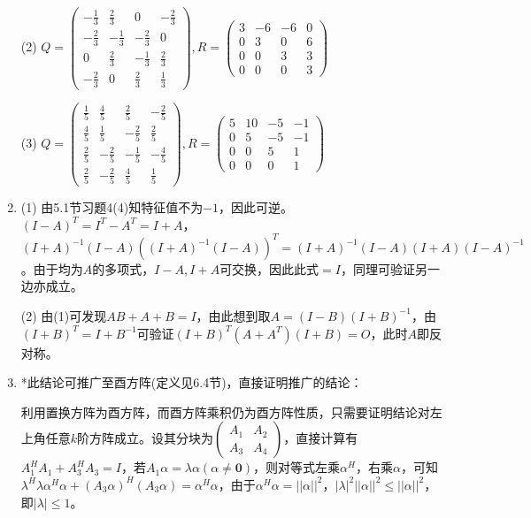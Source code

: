 \documentclass[a4paper,UTF8,fontset=windows]{ctexart}
\begin{document}
\begin{enumerate}
(2) $Q=\begin{pmatrix}-\frac{1}{3}&\frac{2}{3}&0&-\frac{2}{3}\\[1.5ex]-\frac{2}{3}&-\frac{1}{3}&-\frac{2}{3}&0\\[1.5ex]0&\frac{2}{3}&-\frac{1}{3}&\frac{2}{3}\\[1.5ex]-\frac{2}{3}&0&\frac{2}{3}&\frac{1}{3}\end{pmatrix},R=\begin{pmatrix}3&-6&-6&0\\0&3&0&6\\0&0&3&3\\0&0&0&3\end{pmatrix}$

(3) $Q=\begin{pmatrix}\frac{1}{5}&\frac{4}{5}&\frac{2}{5}&-\frac{2}{5}\\[1.5ex]\frac{4}{5}&\frac{1}{5}&-\frac{2}{5}&\frac{2}{5}\\[1.5ex]\frac{2}{5}&-\frac{2}{5}&-\frac{1}{5}&-\frac{4}{5}\\[1.5ex]\frac{2}{5}&-\frac{2}{5}&\frac{4}{5}&\frac{1}{5}\end{pmatrix},R=\begin{pmatrix}5&10&-5&-1\\0&5&-5&-1\\0&0&5&1\\0&0&0&1\end{pmatrix}$

\item
(1) 由5.1节习题4(4)知特征值不为$-1$，因此可逆。$(I-A)^T=I^T-A^T=I+A$，$(I+A)^{-1}(I-A)((I+A)^{-1}(I-A))^T=(I+A)^{-1}(I-A)(I+A)(I-A)^{-1}$。由于均为$A$的多项式，$I-A,I+A$可交换，因此此式$=I$，同理可验证另一边亦成立。

(2) 由(1)可发现$AB+A+B=I$，由此想到取$A=(I-B)(I+B)^{-1}$，由$(I+B)^T=I+B^{-1}$可验证$(I+B)^T(A+A^T)(I+B)=O$，此时$A$即反对称。

\item
*此结论可推广至酉方阵(定义见6.4节)，直接证明推广的结论：

利用置换方阵为酉方阵，而酉方阵乘积仍为酉方阵性质，只需要证明结论对左上角任意$k$阶方阵成立。设其分块为$\begin{pmatrix}A_1&A_2\\A_3&A_4\end{pmatrix}$，直接计算有$A_1^HA_1+A_3^HA_3=I$，若$A_1\alpha=\lambda\alpha(\alpha\ne\mathbf{0})$，则对等式左乘$\alpha^H$，右乘$\alpha$，可知$\lambda^H\lambda\alpha^H\alpha+\left(A_3\alpha\right)^H(A_3\alpha)=\alpha^H\alpha$，由于$\alpha^H\alpha=||\alpha||^2$，$|\lambda|^2||\alpha||^2\le||\alpha||^2$，即$|\lambda|\le1$。


\end{enumerate}
\end{document}
